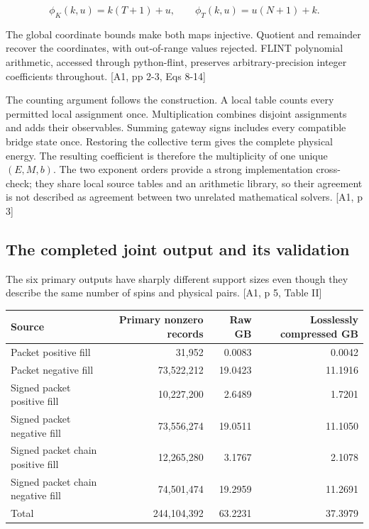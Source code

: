 \[\phi_K(k,u)=k(T+1)+u,\qquad \phi_T(k,u)=u(N+1)+k.\]

The global coordinate bounds make both maps injective. Quotient and remainder recover the coordinates, with out-of-range values rejected. FLINT polynomial arithmetic, accessed through python-flint, preserves arbitrary-precision integer coefficients throughout. {[}A1, pp 2-3, Eqs 8-14{]}

The counting argument follows the construction. A local table counts every permitted local assignment once. Multiplication combines disjoint assignments and adds their observables. Summing gateway signs includes every compatible bridge state once. Restoring the collective term gives the complete physical energy. The resulting coefficient is therefore the multiplicity of one unique \((E,M,b)\). The two exponent orders provide a strong implementation cross-check; they share local source tables and an arithmetic library, so their agreement is not described as agreement between two unrelated mathematical solvers. {[}A1, p 3{]}

\subsection{The completed joint output and its validation}\label{the-completed-joint-output-and-its-validation}

The six primary outputs have sharply different support sizes even though they describe the same number of spins and physical pairs. {[}A1, p 5, Table II{]}

\begin{table}[htbp]\centering\scriptsize
\begin{tabular}{@{}lrrr@{}}
\toprule
Source & Primary nonzero records & Raw GB & Losslessly compressed GB \\
\midrule
Packet positive fill & 31,952 & 0.0083 & 0.0042 \\
Packet negative fill & 73,522,212 & 19.0423 & 11.1916 \\
Signed packet positive fill & 10,227,200 & 2.6489 & 1.7201 \\
Signed packet negative fill & 73,556,274 & 19.0511 & 11.1050 \\
Signed packet chain positive fill & 12,265,280 & 3.1767 & 2.1078 \\
Signed packet chain negative fill & 74,501,474 & 19.2959 & 11.2691 \\
Total & 244,104,392 & 63.2231 & 37.3979 \\
\bottomrule
\end{tabular}
\end{table}

